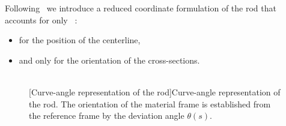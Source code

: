 Following~ we introduce a reduced coordinate formulation of the rod that accounts for only ~:
\begin{itemize}
\item {} for the position of the centerline,
\item and only  for the orientation of the cross-sections.
\end{itemize}
\begin{figure}[t]
     		\centering
		\hspace{2.5cm}
		 \\
		\vspace{10pt}
		[Curve-angle representation of the rod]{Curve-angle representation of the rod. The orientation of the material frame is established from the reference frame by the deviation angle $\theta(s)$.}
		\label{fig:curve_angle}    
\end{figure}

